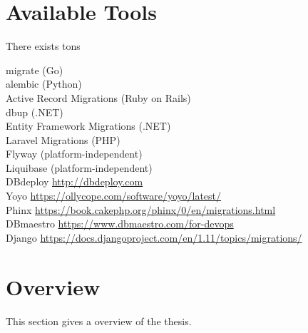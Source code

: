 \section{Available Tools}%
There exists tons 


migrate (Go)\\
alembic (Python)\\
Active Record Migrations (Ruby on Rails)\\
dbup (.NET)\\
Entity Framework Migrations (.NET)\\
Laravel Migrations (PHP)\\
Flyway (platform-independent)\\
Liquibase (platform-independent)\\
DBdeploy \url{http://dbdeploy.com}\\
Yoyo \url{https://ollycope.com/software/yoyo/latest/}\\
Phinx \url{https://book.cakephp.org/phinx/0/en/migrations.html}\\
DBmaestro \url{https://www.dbmaestro.com/for-devops}\\
Django \url{https://docs.djangoproject.com/en/1.11/topics/migrations/}



\section{Overview}%
This section gives a overview of the thesis.




\newpage